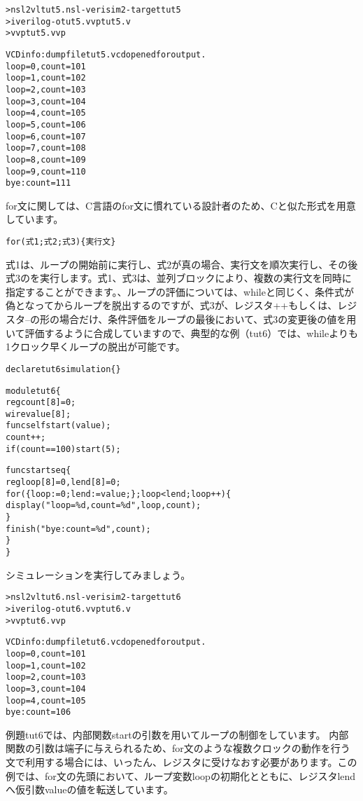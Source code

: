 \begin{reviewcmd}
\begin{alltt}
\textgreater{} nsl2vl tut5.nsl -verisim2 -target tut5
\textgreater{} iverilog -otut5.vvp tut5.v
\textgreater{} vvp tut5.vvp

VCD info: dumpfile tut5.vcd opened for output.
loop =   0, count = 101
loop =   1, count = 102
loop =   2, count = 103
loop =   3, count = 104
loop =   4, count = 105
loop =   5, count = 106
loop =   6, count = 107
loop =   7, count = 108
loop =   8, count = 109
loop =   9, count = 110
bye: count = 111
\end{alltt}
\end{reviewcmd}

for文に関しては、C言語のfor文に慣れている設計者のため、Cと似た形式を用意しています。

\begin{reviewemlist}
\begin{alltt}
for(式1; 式2; 式3) \{ 実行文 \}
\end{alltt}
\end{reviewemlist}

式1は、ループの開始前に実行し、式2が真の場合、実行文を順次実行し、その後式3のを実行します。式1、式3は、並列ブロックにより、複数の実行文を同時に指定することができます。、ループの評価については、whileと同じく、条件式が偽となってからループを脱出するのですが、式3が、レジスタ++もしくは、レジスタ--の形の場合だけ、条件評価をループの最後において、式3の変更後の値を用いて評価するように合成していますので、典型的な例（tut6）では、whileよりも1クロック早くループの脱出が可能です。

\begin{reviewlist}
\begin{alltt}
declare tut6 simulation \{ \}

module tut6 \{
   reg count[8] = 0;
   wire value[8];
   func\textunderscore{}self  start(value);
   count++;
   if(count==100) start(5);

   func start seq \{
       reg loop[8]=0,lend[8]=0;
       for(\{loop:=0;lend:=value;\};loop\textless{}lend; loop++) \{
           \textunderscore{}display("loop = \%d, count = \%d", loop, count);
       \}
       \textunderscore{}finish("bye: count = \%d", count);
   \}
\}
\end{alltt}
\end{reviewlist}


シミュレーションを実行してみましょう。

\begin{reviewcmd}
\begin{alltt}
\textgreater{} nsl2vl tut6.nsl -verisim2 -target tut6
\textgreater{} iverilog -otut6.vvp tut6.v
\textgreater{} vvp tut6.vvp

VCD info: dumpfile tut6.vcd opened for output.
loop =   0, count = 101
loop =   1, count = 102
loop =   2, count = 103
loop =   3, count = 104
loop =   4, count = 105
bye: count = 106
\end{alltt}
\end{reviewcmd}

例題tut6では、内部関数startの引数を用いてループの制御をしています。 内部関数の引数は端子に与えられるため、for文のような複数クロックの動作を行う文で利用する場合には、いったん、レジスタに受けなおす必要があります。この例では、for文の先頭において、ループ変数loopの初期化とともに、レジスタlendへ仮引数valueの値を転送しています。
